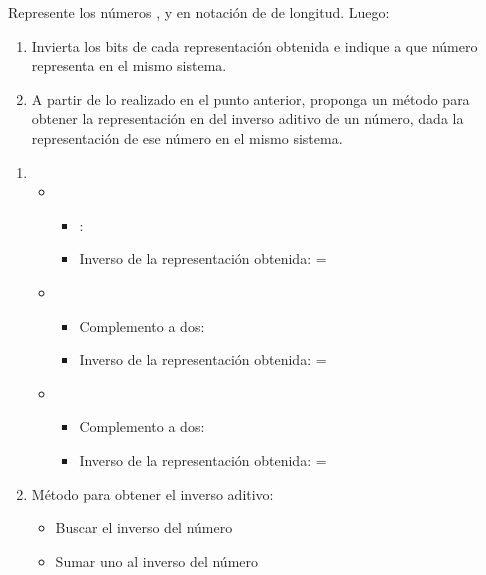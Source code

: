\begin{enunciado}{\ejercicio}
  Represente los números ,  y  en notación \compDos de  de
  longitud. Luego:

  \begin{enumerate}[label=\alph*)]
    \item Invierta los bits de cada representación obtenida e indique a que número representa en
          el mismo sistema.
    \item A partir de lo realizado en el punto anterior, proponga un método para obtener la representación en
          \compDos del inverso aditivo de un número, dada la representación de ese número en el mismo
          sistema.
  \end{enumerate}
\end{enunciado}

\begin{enumerate}[label=(\alph*)]
  \item \begin{itemize}
          \item {}
                \begin{itemize}
                  \item \compDos:  
                  \item Inverso de la representación obtenida:  = 
                \end{itemize}
          \item {}
                \begin{itemize}
                  \item Complemento a dos: 
                  \item Inverso de la representación obtenida:  =  
                \end{itemize}
          \item {}
                \begin{itemize}
                  \item Complemento a dos: 
                  \item Inverso de la representación obtenida:  =  
                \end{itemize}
        \end{itemize}
  \item Método para obtener el inverso aditivo:
        \begin{itemize}
          \item Buscar el inverso del número
          \item Sumar uno al inverso del número
        \end{itemize}
\end{enumerate}

\begin{aportes}
  \item {}
\end{aportes}
